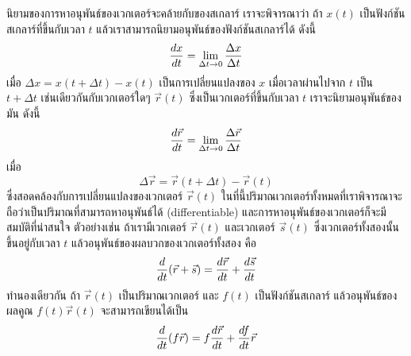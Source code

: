 นิยามของการหาอนุพันธ์ของเวกเตอร์จะคล้ายกับของสเกลาร์ เราจะพิจารณาว่า ถ้า $x(t)$ เป็นฟังก์ชันสเกลาร์ที่ขึ้นกับเวลา $t$ แล้วเราสามารถนิยามอนุพันธ์ของฟังก์ชันสเกลาร์ได้ ดังนี้
\begin{equation}\label{Def:DerivativeXt}
\frac{d{x}}{d{t}} = \lim_{\Delta t \rightarrow 0}\frac{\Delta x}{\Delta t}
\end{equation}
เมื่อ $\Delta x = x(t + \Delta t) - x(t)$ เป็นการเปลี่ยนแปลงของ $x$ เมื่อเวลาผ่านไปจาก $t$ เป็น $t + \Delta t$ เช่นเดียวกันกับเวกเตอร์ใดๆ $\vec{r}(t)$ ซึ่งเป็นเวกเตอร์ที่ขึ้นกับเวลา $t$ เราจะนิยามอนุพันธ์ของมัน ดังนี้
\begin{equation}\label{Def:DerivativeRt}
\frac{d{\vec{r}}}{d{t}} = \lim_{\Delta t \rightarrow 0}\frac{\Delta \vec{r}}{\Delta t}
\end{equation}
เมื่อ
\begin{equation}\label{Def:DeltaRfn}
\Delta\vec{r} = \vec{r}(t + \Delta t) - \vec{r}(t)
\end{equation}
ซึ่งสอดคล้องกับการเปลี่ยนแปลงของเวกเตอร์ $\vec{r}(t)$ ในที่นี้ปริมาณเวกเตอร์ทั้งหมดที่เราพิจารณาจะถือว่าเป็นปริมาณที่สามารถหาอนุพันธ์ได้ (differentiable) และการหาอนุพันธ์ของเวกเตอร์ก็จะมีสมบัติที่น่าสนใจ ตัวอย่างเช่น ถ้าเรามีเวกเตอร์ $\vec{r}(t)$ และเวกเตอร์ $\vec{s}(t)$ ซึ่งเวกเตอร์ทั้งสองนั้นขึ้นอยู่กับเวลา $t$ แล้วอนุพันธ์ของผลบวกของเวกเตอร์ทั้งสอง คือ
\begin{equation}\label{Eqn:DerivativeSumVect}
\frac{d}{dt} (\vec{r} + \vec{s}) = \frac{d{\vec{r}}}{d{t}} + \frac{d{\vec{s}}}{d{t}}
\end{equation}
ทำนองเดียวกัน ถ้า $\vec{r}(t)$ เป็นปริมาณเวกเตอร์ และ $f(t)$ เป็นฟังก์ชันสเกลาร์ แล้วอนุพันธ์ของผลคูณ $f(t)\vec{r}(t)$ จะสามารถเขียนได้เป็น
\begin{equation}\label{Eqn:DerivativefR}
\frac{d}{dt} (f\vec{r}) = f\frac{d{\vec{r}}}{d{t}} + \frac{d{f}}{d{t}}\vec{r}
\end{equation}

